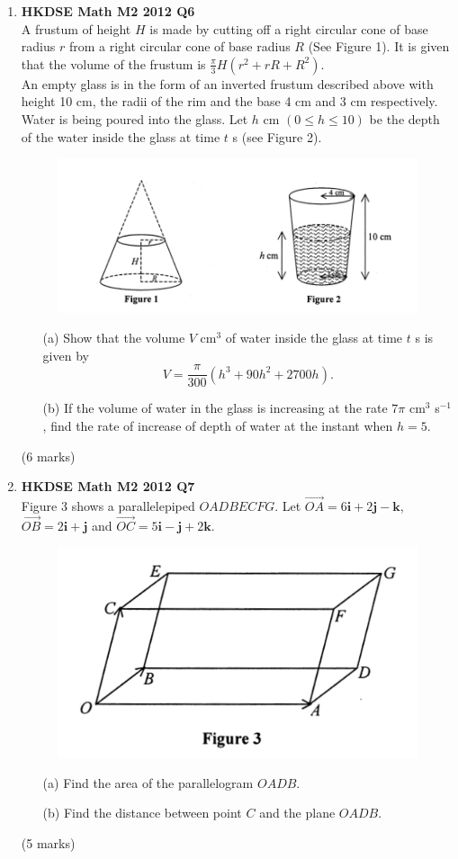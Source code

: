 \documentclass{report}
\begin{document}
\begin{enumerate}
	\item \textbf{HKDSE Math M2 2012 Q6}\\
	A frustum of height $H$ is made by cutting off a right circular cone of base radius $r$ from a right circular cone of base radius $R$ (See Figure 1). It is given that the volume of the frustum is $\displaystyle\frac{\pi}{3}H(r^2 + rR + R^2)$. \\
	An empty glass is in the form of an inverted frustum described above with height 10 cm, the radii of the rim and the base 4 cm and 3 cm respectively. Water is being poured into the glass. Let $h$ cm $(0 \leq h \leq 10)$ be the depth of the water inside the glass at time $t$ s (see Figure 2).
	\begin{figure}[H]
		\centering
		\includegraphics[width = .6\linewidth]{2012Figure1n2}
	\end{figure}
	\begin{enumerate}
		\item [(a)]Show that the volume $V$ cm$^{3}$ of water inside the glass at time $t$ s is given by 
		$$V = \displaystyle\frac{\pi}{300}(h^3+90h^2+2700h).$$
		\item [(b)]If the volume of water in the glass is increasing at the rate $7\pi$ cm$^3$ s$^{-1}$, find the rate of increase of depth of water at the instant when $h = 5$.
	\end{enumerate}
	(6 marks)

	\item \textbf{HKDSE Math M2 2012 Q7}\\
	Figure 3 shows a parallelepiped $OADBECFG$. Let $\overrightarrow{OA} = 6\textbf{i} +2\textbf{j} -\textbf{k}$, $\overrightarrow{OB} = 2\textbf{i} +\textbf{j} $ and $\overrightarrow{OC} = 5\textbf{i} -\textbf{j} +2\textbf{k}$.
	\begin{figure}[H]
		\centering
		\includegraphics[width = .4\linewidth]{2012Figure3}
	\end{figure}
	\begin{enumerate}
		\item [(a)]Find the area of the parallelogram $OADB$. 
		\item [(b)]Find the distance between point $C$ and the plane $OADB$.
	\end{enumerate}
	(5 marks)


\end{enumerate}
\end{document}
